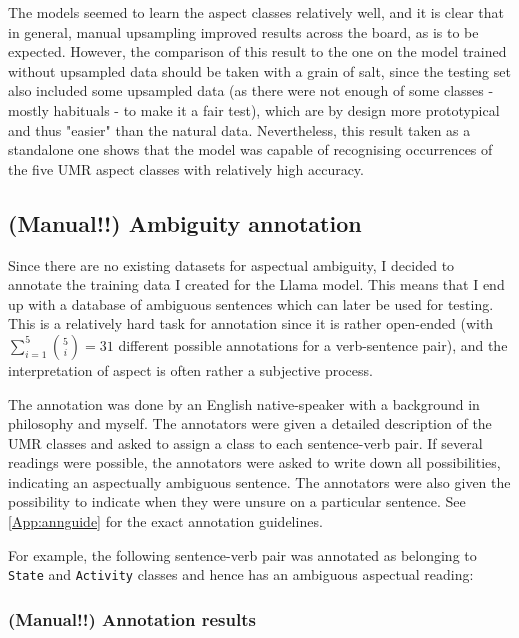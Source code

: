 The models seemed to learn the aspect classes relatively well, and it is clear that in general, manual upsampling improved results across the board, as is to be expected. However, the comparison of this result to the one on the model trained without upsampled data should be taken with a grain of salt, since the testing set also included some upsampled data (as there were not enough of some classes - mostly habituals - to make it a fair test), which are by design more prototypical and thus "easier" than the natural data. Nevertheless, this result taken as a standalone one shows that the model was capable of recognising occurrences of the five UMR aspect classes with relatively high accuracy.

\subsection{(Manual!!) Ambiguity annotation}
\label{sect:manual_amb_annotation}
Since there are no existing datasets for aspectual ambiguity, I decided to annotate the training data I created for the Llama model. This means that I end up with a database of ambiguous sentences which can later be used for testing. This is a relatively hard task for annotation since it is rather open-ended (with $\sum_{i=1}^{5} \binom{5}{i}=31$ different possible annotations for a verb-sentence pair), and the interpretation of aspect is often rather a subjective process.

The annotation was done by an English native-speaker with a background in philosophy and myself. The annotators were given a detailed description of the UMR classes and asked to assign a class to each sentence-verb pair. If several readings were possible, the annotators were asked to write down all possibilities, indicating an aspectually ambiguous sentence. The annotators were also given the possibility to indicate when they were unsure on a particular sentence. See \ref{App:annguide} for the exact annotation guidelines.

For example, the following sentence-verb pair was annotated as belonging to \texttt{State} and \texttt{Activity} classes and hence has an ambiguous aspectual reading:

\begin{exe}
\end{exe}
\label{ambigExampleSent}

\subsubsection{(Manual!!) Annotation results}


